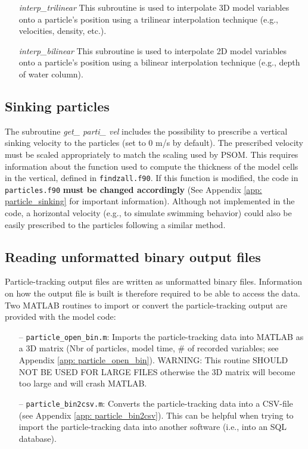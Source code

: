 \documentclass[12pt,letterpaper,titlepage]{article}
\newcommand{\fixme}[1]{\color{red}$<$\textbf{FIX ME: #1}$>$\color{black}}
\begin{document}
\begin{itemize}
	\item[\textit{interp\_trilinear}]	This subroutine is used to interpolate 3D model variables onto a particle's position using a trilinear interpolation technique (e.g., velocities, density, etc.).
	
	\item[\textit{interp\_bilinear}]	This subroutine is used to interpolate 2D model variables onto a particle's position using a bilinear interpolation technique (e.g., depth of water column).
\end{itemize}

\subsection{Sinking particles}

The subroutine \textit{get\_ parti\_ vel} includes the possibility to prescribe a vertical sinking velocity to the particles (set to 0 m/s by default). The prescribed velocity must be scaled appropriately to match the scaling used by PSOM. This requires information about the function used to compute the thickness of the model cells in the vertical, defined in \texttt{findzall.f90}. If this function is modified, the code in \texttt{particles.f90} \textbf{must be changed accordingly} (See Appendix \ref{app: particle_sinking} for important information). %
Although not implemented in the code, a horizontal velocity (e.g., to simulate swimming behavior) could also be easily prescribed to the particles following a similar method.

\subsection{Reading unformatted binary output files}
Particle-tracking output files are written as unformatted binary files. Information on how the output file is built is therefore required to be able to access the data. Two MATLAB routines to import or convert the particle-tracking output are provided with the model code:
\begin{enumerate}
	\item [--] \texttt{particle\_open\_bin.m}: Imports the particle-tracking data into MATLAB as a 3D matrix (Nbr of particles, model time, \# of recorded variables; see Appendix \ref{app: particle_open_bin}). WARNING: This routine SHOULD NOT BE USED FOR LARGE FILES otherwise the 3D matrix will become too large and will crash MATLAB.
	\item [--] \texttt{particle\_bin2csv.m}: Converts the particle-tracking data into a CSV-file (see Appendix \ref{app: particle_bin2csv}). This can be helpful when trying to import the particle-tracking data into another software (i.e., into an SQL database).
\end{enumerate}
\end{document}
